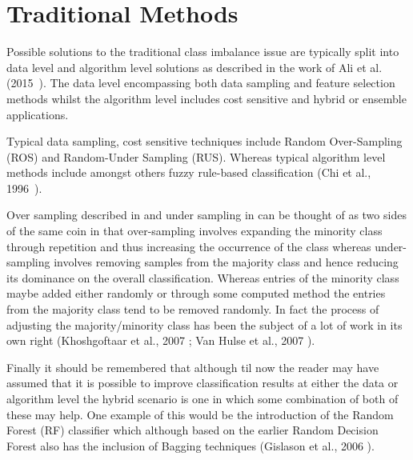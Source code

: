 \section{Traditional Methods}\label{sec:TradMethods}
Possible solutions to the traditional class imbalance issue are typically split into data level and algorithm level solutions as described in the work of Ali et al. (2015~\cite{ali2015classification}). The data level encompassing both data sampling and feature selection methods whilst the algorithm level includes cost sensitive and hybrid or ensemble applications. 
\par
Typical data sampling, cost sensitive techniques include Random Over-Sampling (ROS) and Random-Under Sampling (RUS). Whereas typical algorithm level methods include amongst others fuzzy rule-based classification (Chi et al., 1996~\cite{chi1996fuzzy}).
\par
Over sampling described in  and under sampling in  can be thought of as two sides of the same coin in that over-sampling involves expanding the minority class through repetition and thus increasing the occurrence of the class whereas under-sampling involves removing samples from the majority class and hence reducing its dominance on the overall classification. Whereas entries of the minority class maybe added either randomly or through some computed method the entries from the majority class tend to be removed randomly. In fact the process of adjusting the majority/minority class has been the subject of a lot of work in its own right (Khoshgoftaar et al., 2007  \cite{khoshgoftaar2007learning}; Van Hulse et al., 2007 \cite{van2007experimental}).
\par
Finally it should be remembered that although til now the reader may have assumed that it is possible to improve classification results at either the data or algorithm level the hybrid scenario is one in which some combination of both of these may help. One example of this would be the introduction of the Random Forest (RF) classifier which although based on the earlier Random Decision Forest also has the inclusion of Bagging techniques (Gislason et al., 2006 \cite{gislason2006random}). 

